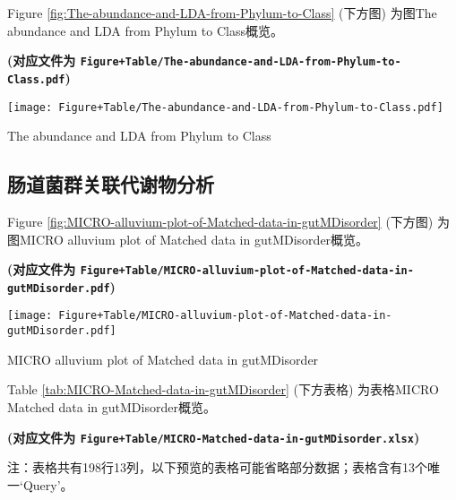 \documentclass[
]{article}
\begin{document}
Figure \ref{fig:The-abundance-and-LDA-from-Phylum-to-Class} (下方图) 为图The abundance and LDA from Phylum to Class概览。

\textbf{(对应文件为 \texttt{Figure+Table/The-abundance-and-LDA-from-Phylum-to-Class.pdf})}

\def\@captype{figure}
\begin{center}
\texttt{[image: Figure+Table/The-abundance-and-LDA-from-Phylum-to-Class.pdf]}
\caption{The abundance and LDA from Phylum to Class}\label{fig:The-abundance-and-LDA-from-Phylum-to-Class}
\end{center}

\hypertarget{meta}{%
\subsection{肠道菌群关联代谢物分析}\label{meta}}

Figure \ref{fig:MICRO-alluvium-plot-of-Matched-data-in-gutMDisorder} (下方图) 为图MICRO alluvium plot of Matched data in gutMDisorder概览。

\textbf{(对应文件为 \texttt{Figure+Table/MICRO-alluvium-plot-of-Matched-data-in-gutMDisorder.pdf})}

\def\@captype{figure}
\begin{center}
\texttt{[image: Figure+Table/MICRO-alluvium-plot-of-Matched-data-in-gutMDisorder.pdf]}
\caption{MICRO alluvium plot of Matched data in gutMDisorder}\label{fig:MICRO-alluvium-plot-of-Matched-data-in-gutMDisorder}
\end{center}

Table \ref{tab:MICRO-Matched-data-in-gutMDisorder} (下方表格) 为表格MICRO Matched data in gutMDisorder概览。

\textbf{(对应文件为 \texttt{Figure+Table/MICRO-Matched-data-in-gutMDisorder.xlsx})}

\begin{center}\begin{tcolorbox}[colback=gray!10, colframe=gray!50, width=0.9\linewidth, arc=1mm, boxrule=0.5pt]注：表格共有198行13列，以下预览的表格可能省略部分数据；表格含有13个唯一`Query'。
\end{tcolorbox}
\end{center}
\end{document}
